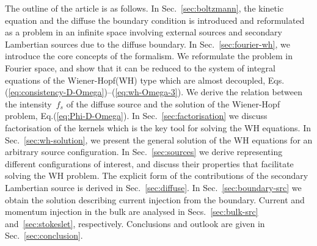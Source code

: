 \documentclass[preprint,aps,eqsecnum]{revtex4-1}
\begin{document}
The outline of the article is as follows. In Sec.~\ref{sec:boltzmann},
the kinetic equation and the diffuse the boundary condition is introduced
and reformulated as a problem in an infinite space involving external
sources and secondary Lambertian sources due to the diffuse boundary.
In Sec.~\ref{sec:fourier-wh}, we introduce the core concepts of the formalism.
We reformulate the problem in Fourier space, and show that
it can be reduced to the system of integral equations of the
Wiener-Hopf(WH) type which are almost decoupled,
Eqs.(\ref{eq:consistency-D-Omega})--(\ref{eq:wh-Omega-3}).
We derive the relation between the intensity~$f_s$ of the diffuse source
and the solution of the  Wiener-Hopf problem, Eq.(\ref{eq:Phi-D-Omega}).
In Sec.~\ref{sec:factorisation} we discuss factorisation of the
kernels which is the key tool for solving the WH equations.
In Sec.~\ref{sec:wh-solution},
we present the general solution of the WH
equations for an arbitrary source configuration.
In Sec.~\ref{sec:sources} we derive
representing different configurations of interest,
and discuss their properties that facilitate solving the WH problem.
The explicit form of the contributions of the secondary
Lambertian source is derived in Sec.~\ref{sec:diffuse}.
In Sec.~\ref{sec:boundary-src} we obtain the solution describing current
injection from the boundary. Current and momentum injection in the bulk
are analysed in Secs.~\ref{sec:bulk-src} and~\ref{sec:stokeslet}, respectively.
Conclusions and outlook are given in Sec.~\ref{sec:conclusion}.
\end{document}
